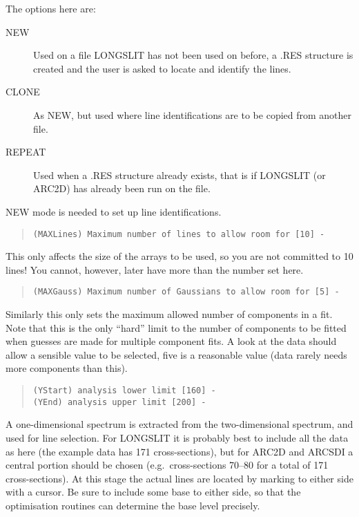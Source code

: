 The options here are:

\begin{description}

\item[NEW] Used on a file LONGSLIT has not been used on before, a
.RES structure is created and the user is asked to locate and identify
the lines.

\item[CLONE] As NEW, but used where line identifications are to be
copied from another file.

\item[REPEAT] Used when a .RES structure already exists, that is if
LONGSLIT (or ARC2D) has already been run on the file.

\end{description}

NEW mode is needed to set up line identifications.

\begin{quote}\begin{verbatim}
(MAXLines) Maximum number of lines to allow room for [10] -
\end{verbatim}\end{quote}

This only affects the size of the arrays to be used, so you are not
committed to 10 lines!
You cannot, however, later have more than the number set here.

\begin{quote}\begin{verbatim}
(MAXGauss) Maximum number of Gaussians to allow room for [5] -
\end{verbatim}\end{quote}

Similarly this only sets the maximum allowed number of components in a
fit.
Note that this is the only ``hard'' limit to the number of components to
be fitted when guesses are made for multiple component fits.
A look at the data should allow a sensible value to be selected, five is
a reasonable value (data rarely needs more components than this).

\begin{quote}\begin{verbatim}
(YStart) analysis lower limit [160] -
(YEnd) analysis upper limit [200] -
\end{verbatim}\end{quote}

A one-dimensional spectrum is extracted from the two-dimensional
spectrum, and used for line selection.
For LONGSLIT it is probably best to include all the data as here (the
example data has 171 cross-sections), but for ARC2D and ARCSDI a central
portion should be chosen (e.g.\ cross-sections 70--80 for a total of 171
cross-sections).
At this stage the actual lines are located by marking to either side
with a cursor.
Be sure to include some base to either side, so that the optimisation
routines can determine the base level precisely.

